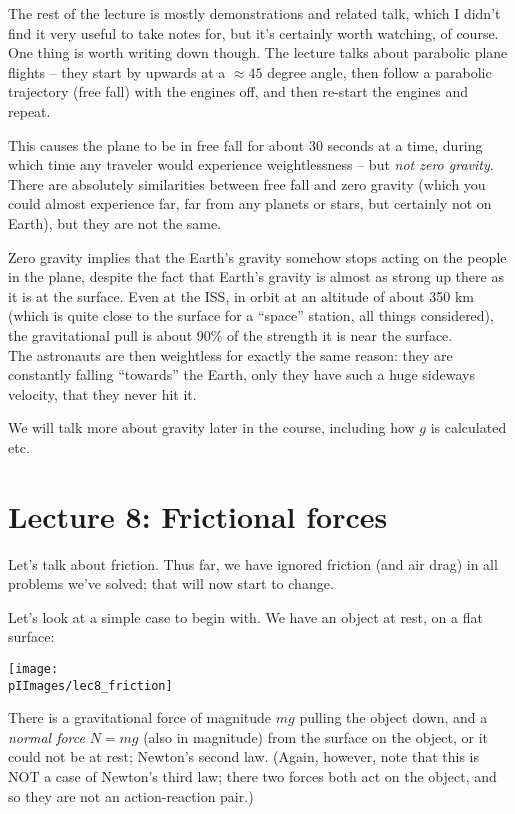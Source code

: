 The rest of the lecture is mostly demonstrations and related talk, which I didn't find it very useful to take notes for, but it's certainly worth watching, of course.\\
One thing is worth writing down though. The lecture talks about parabolic plane flights -- they start by upwards at a $\approx 45$ degree angle, then follow a parabolic trajectory (free fall) with the engines off, and then re-start the engines and repeat.

This causes the plane to be in free fall for about 30 seconds at a time, during which time any traveler would experience weightlessness -- but \emph{not zero gravity}. There are absolutely similarities between free fall and zero gravity (which you could almost experience far, far from any planets or stars, but certainly not on Earth), but they are not the same.

Zero gravity implies that the Earth's gravity somehow stops acting on the people in the plane, despite the fact that Earth's gravity is almost as strong up there as it is at the surface. Even at the ISS, in orbit at an altitude of about 350 km (which is quite close to the surface for a ``space'' station, all things considered), the gravitational pull is about 90\% of the strength it is near the surface.\\
The astronauts are then weightless for exactly the same reason: they are constantly falling ``towards'' the Earth, only they have such a huge sideways velocity, that they never hit it.

We will talk more about gravity later in the course, including how $g$ is calculated etc.

\section{Lecture 8: Frictional forces}

Let's talk about friction. Thus far, we have ignored friction (and air drag) in all problems we've solved; that will now start to change.

Let's look at a simple case to begin with. We have an object at rest, on a flat surface:

\begin{center}
\texttt{[image: \\pIImages/lec8\_friction]}
\end{center}

There is a gravitational force of magnitude $m g$ pulling the object down, and a \emph{normal force} $N = m g$ (also in magnitude) from the surface on the object, or it could not be at rest; Newton's second law. (Again, however, note that this is NOT a case of Newton's third law; there two forces both act on the object, and so they are not an action-reaction pair.)

